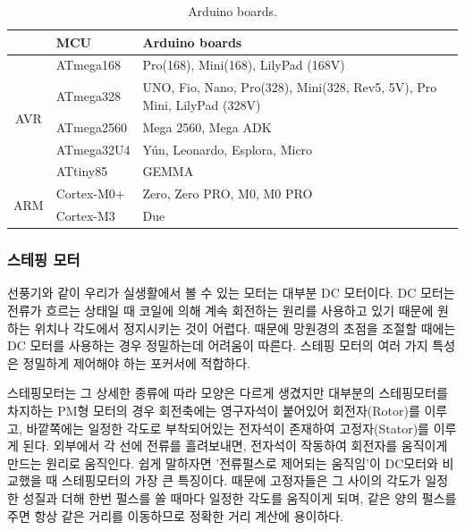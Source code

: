 \begin{table}[H]
	\caption{Arduino boards. \cite{wiki-arduino}}
	\begin{tabular}{c|l|l}
	\toprule[1pt]
		& MCU        & Arduino boards                            \\ 
		\toprule[1pt]
	
		\multirow{5}{*}{AVR} & ATmega168  & Pro(168), Mini(168), LilyPad (168V)                                     \\
		& ATmega328  & UNO, Fio, Nano, Pro(328), Mini(328, Rev5, 5V), Pro Mini, LilyPad (328V) \\
		& ATmega2560 & Mega 2560, Mega ADK                                                     \\
		& ATmega32U4 & Yún, Leonardo, Esplora, Micro                                           \\
		& ATtiny85   & GEMMA                                                                   \\ 
		\midrule[1pt]
		\multirow{2}{*}{ARM} & Cortex-M0+ & Zero, Zero PRO, M0, M0 PRO                                              \\
		& Cortex-M3  & Due      \\
	\bottomrule[1pt]   
	\end{tabular}
	\label{table:arduino_boards}
\end{table}


\subsubsection{스테핑 모터}


선풍기와 같이 우리가 실생활에서 볼 수 있는 모터는 대부분 DC 모터이다. DC 모터는 전류가 흐르는 상태일 때 코일에 의해 계속 회전하는 원리를 사용하고 있기 때문에 원하는 위치나 각도에서 정지시키는 것이 어렵다. 때문에 망원경의 초점을 조절할 때에는 DC 모터를 사용하는 경우 정밀하는데 어려움이 따른다. 스테핑 모터의 여러 가지 특성은 정밀하게 제어해야 하는 포커서에 적합하다.

스테핑모터는 그 상세한 종류에 따라 모양은 다르게 생겼지만 대부분의 스테핑모터를 차지하는 PM형 모터의 경우 회전축에는 영구자석이 붙어있어 회전자(Rotor)를 이루고, 바깥쪽에는 일정한 각도로 부착되어있는 전자석이 존재하여 고정자(Stator)를 이루게 된다. 외부에서 각 선에 전류를 흘려보내면, 전자석이 작동하여 회전자를 움직이게 만드는 원리로 움직인다. 쉽게 말하자면 '전류펄스로 제어되는 움직임'이 DC모터와 비교했을 때 스테핑모터의 가장 큰 특징이다. 때문에 고정자들은 그 사이의 각도가 일정한 성질과 더해 한번 펄스를 쏠 때마다 일정한 각도를 움직이게 되며, 같은 양의 펄스를 주면 항상 같은 거리를 이동하므로 정확한 거리 계산에 용이하다.

